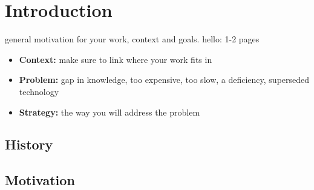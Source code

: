 \chapter{Introduction}
\label{sec:introduction}

general motivation for your work, context and goals. hello: 1-2 pages

\begin{itemize}
    \item \textbf{Context:} make sure to link where your work fits in
    \item \textbf{Problem:} gap in knowledge, too expensive, too slow, a deficiency, superseded technology
    \item \textbf{Strategy:} the way you will address the problem
\end{itemize}


\section{History}
\section{Motivation}
